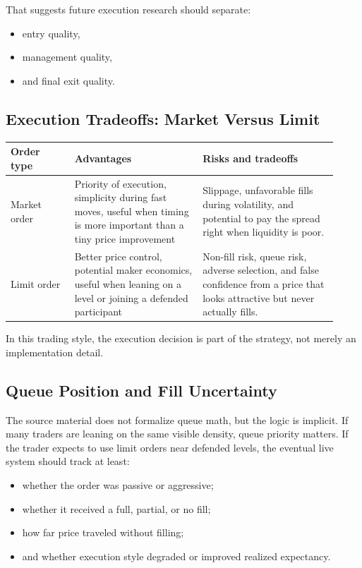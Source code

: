 That suggests future execution research should separate:
\begin{itemize}
  \item entry quality,
  \item management quality,
  \item and final exit quality.
\end{itemize}

\subsection{Execution Tradeoffs: Market Versus Limit}

\begin{longtable}{p{0.18\linewidth}p{0.36\linewidth}p{0.38\linewidth}}
\toprule
\textbf{Order type} & \textbf{Advantages} & \textbf{Risks and tradeoffs} \\
\midrule
Market order & Priority of execution, simplicity during fast moves, useful when timing is more important than a tiny price improvement & Slippage, unfavorable fills during volatility, and potential to pay the spread right when liquidity is poor. \\
Limit order & Better price control, potential maker economics, useful when leaning on a level or joining a defended participant & Non-fill risk, queue risk, adverse selection, and false confidence from a price that looks attractive but never actually fills. \\
\bottomrule
\end{longtable}

In this trading style, the execution decision is part of the strategy, not merely an implementation detail.

\subsection{Queue Position and Fill Uncertainty}

The source material does not formalize queue math, but the logic is implicit.
If many traders are leaning on the same visible density, queue priority matters.
If the trader expects to use limit orders near defended levels, the eventual live system should track at least:
\begin{itemize}
  \item whether the order was passive or aggressive;
  \item whether it received a full, partial, or no fill;
  \item how far price traveled without filling;
  \item and whether execution style degraded or improved realized expectancy.
\end{itemize}

